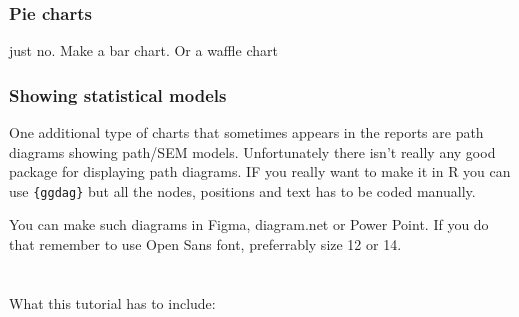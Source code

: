 \documentclass[
  letterpaper,
  DIV=11,
  numbers=noendperiod]{scrreprt}
\begin{document}
\subsection{Pie charts}\label{pie-charts}

just no. Make a bar chart. Or a waffle chart

\subsection{Showing statistical
models}\label{showing-statistical-models}

One additional type of charts that sometimes appears in the reports are
path diagrams showing path/SEM models. Unfortunately there isn't really
any good package for displaying path diagrams. IF you really want to
make it in R you can use \texttt{\{ggdag\}} but all the nodes, positions
and text has to be coded manually.

You can make such diagrams in Figma, diagram.net or Power Point. If you
do that remember to use Open Sans font, preferrably size 12 or 14.


\chapter{}\label{section}

What this tutorial has to include:
\end{document}
